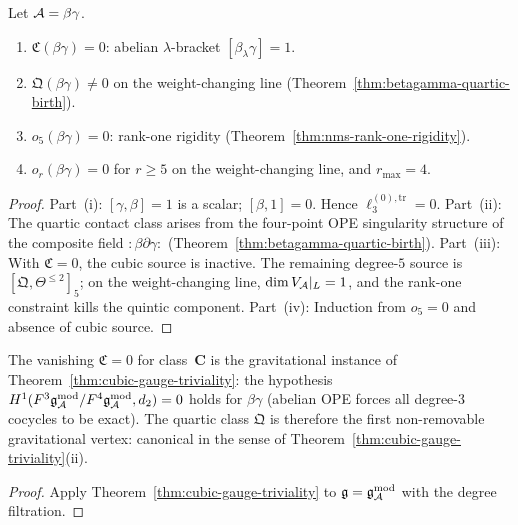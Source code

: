 \begin{theorem}
\label{thm:thqg-contact-termination}
\ClaimStatusProvedHere
{}
Let $\mathcal{A} = \beta\gamma$.
\begin{enumerate}[label=\textup{(\roman*)}]
\item $\mathfrak{C}(\beta\gamma) = 0$: abelian
 $\lambda$-bracket $[\beta_\lambda\gamma] = 1$.
\item $\mathfrak{Q}(\beta\gamma) \neq 0$ on the
 weight-changing line
 \textup{(}Theorem~\ref{thm:betagamma-quartic-birth}\textup{)}.
\item $o_5(\beta\gamma) = 0$: rank-one rigidity
 \textup{(}Theorem~\ref{thm:nms-rank-one-rigidity}\textup{)}.
\item $o_r(\beta\gamma) = 0$ for $r \geq 5$ on the
 weight-changing line, and $r_{\max} = 4$.
\end{enumerate}
\end{theorem}

\begin{proof}
Part~(i): $[\gamma,\beta] = 1$ is a scalar; $[\beta, 1] = 0$.
Hence $\ell_3^{(0),\mathrm{tr}} = 0$.
Part~(ii): The quartic contact class arises from the
four-point OPE singularity structure of the composite field
$:\!\beta\partial\gamma\!:$
(Theorem~\ref{thm:betagamma-quartic-birth}).
Part~(iii): With $\mathfrak{C} = 0$, the cubic source is
inactive. The remaining degree-$5$ source is
$[\mathfrak{Q}, \Theta^{\leq 2}]_5$; on the weight-changing
line, $\dim V_{\mathcal{A}}|_L = 1$, and the rank-one constraint
kills the quintic component.
Part~(iv): Induction from $o_5 = 0$ and absence of cubic
source.
\end{proof}

\begin{proposition}
\label{prop:thqg-cubic-gauge}
\ClaimStatusProvedHere
{}
The vanishing $\mathfrak{C} = 0$ for class~$\mathbf{C}$ is
the gravitational instance of
Theorem~\ref{thm:cubic-gauge-triviality}: the hypothesis
$H^1(F^3\mathfrak{g}_{\mathcal{A}}^{\mathrm{mod}}/F^4\mathfrak{g}_{\mathcal{A}}^{\mathrm{mod}}, d_2) = 0$ holds for $\beta\gamma$
\textup{(}abelian OPE forces all degree-$3$ cocycles to be
exact\textup{)}. The quartic class $\mathfrak{Q}$ is therefore
the first non-removable gravitational vertex: canonical in the
sense of Theorem~\ref{thm:cubic-gauge-triviality}(ii).
\end{proposition}

\begin{proof}
Apply Theorem~\ref{thm:cubic-gauge-triviality} to
$\mathfrak{g} = \mathfrak{g}_{\mathcal{A}}^{\mathrm{mod}}$ with the degree filtration.
\end{proof}


